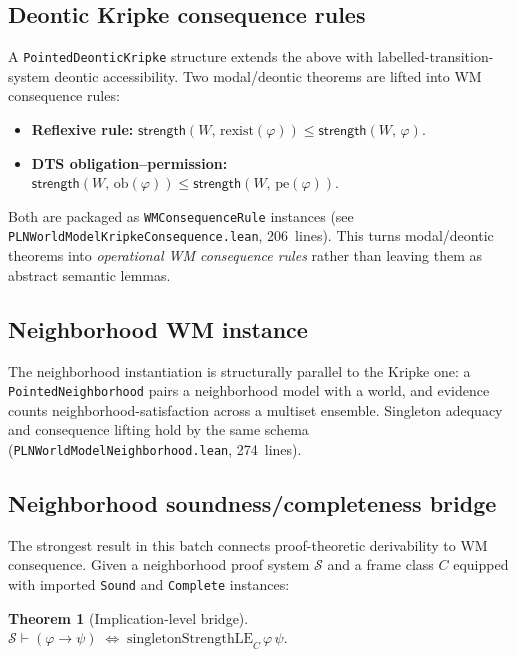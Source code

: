 \documentclass[]{article}
\newtheorem{theorem}{Theorem}
\newcommand{\code}[1]{\texttt{#1}}
\newcommand{\Strength}{\mathsf{strength}}
\begin{document}
\subsection{Deontic Kripke consequence rules}
\label{sec:deontic-kripke}

A \code{PointedDeonticKripke} structure extends the above with
labelled-transition-system deontic accessibility. Two modal/deontic
theorems are lifted into WM consequence rules:

\begin{itemize}[leftmargin=2em]
\item \textbf{Reflexive rule:}
  $\Strength(W,\,\mathrm{rexist}(\varphi)) \le \Strength(W,\,\varphi)$.
\item \textbf{DTS obligation--permission:}
  $\Strength(W,\,\mathrm{ob}(\varphi)) \le \Strength(W,\,\mathrm{pe}(\varphi))$.
\end{itemize}

\noindent
Both are packaged as \code{WMConsequenceRule} instances (see
\code{PLNWorldModelKripkeConsequence.lean}, 206~lines). This turns
modal/deontic theorems into \emph{operational WM consequence rules}
rather than leaving them as abstract semantic lemmas.


\subsection{Neighborhood WM instance}
\label{sec:neighborhood-wm}

The neighborhood instantiation is structurally parallel to the Kripke one:
a \code{PointedNeighborhood} pairs a neighborhood model with a world, and
evidence counts neighborhood-satisfaction across a multiset ensemble.
Singleton adequacy and consequence lifting hold by the same schema
(\code{PLNWorldModelNeighborhood.lean}, 274~lines).


\subsection{Neighborhood soundness/completeness bridge}
\label{sec:neighborhood-sc}

The strongest result in this batch connects proof-theoretic derivability
to WM consequence. Given a neighborhood proof system $\mathcal{S}$ and a
frame class $C$ equipped with imported \code{Sound} and \code{Complete}
instances:

\begin{theorem}[Implication-level bridge]
\label{thm:neighborhood-sc}
$\mathcal{S} \vdash (\varphi \to \psi)
\;\iff\;
\mathrm{singletonStrengthLE}_C\,\varphi\,\psi.$
\end{theorem}
\end{document}

